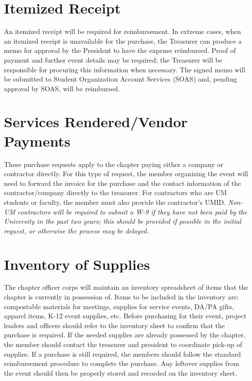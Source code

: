 \documentclass[bylaws,final,10pt,withoutoptional,withoutpreface,officerdoc]{../bylaws}
\begin{document}
\section{Itemized Receipt} An itemized receipt will be required for reimbursement. In extreme cases, when an itemized receipt is unavailable for the purchase, the Treasurer can produce a memo for approval by the President to have the expense reimbursed. Proof of payment and further event details may be required; the Treasurer will be responsible for procuring this information when necessary. The signed memo will be submitted to Student Organization Account Services (SOAS) and, pending approval by SOAS, will be reimbursed.

\section{Services Rendered/Vendor Payments} These purchase requests apply to the chapter paying either a company or contractor directly. For this type of request, the member organizing the event will need to forward the invoice for the purchase and the contact information of the contractor/company directly to the treasurer. For contractors who are UM students or faculty, the member must also provide the contractor's UMID. {\it Non-UM contractors will be required to submit a W-9 if they have not been paid by the University in the past two years; this should be provided if possible in the initial request, or otherwise the process may be delayed.}

\section{Inventory of Supplies} The chapter officer corps will maintain an inventory spreadsheet of items that the chapter is currently in possession of. Items to be included in the inventory are: compostable materials for meetings, supplies for service events, DA/PA gifts, apparel items, K-12 event supplies, etc. Before purchasing for their event, project leaders and officers should refer to the inventory sheet to confirm that the purchase is required. If the needed supplies are already possessed by the chapter, the member should contact the treasurer and president to coordinate pick-up of supplies. If a purchase is still required, the members should follow the standard reimbursement procedure to complete the purchase. Any leftover supplies from the event should then be properly stored and recorded on the inventory sheet.
\end{document}
